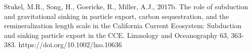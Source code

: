\documentclass[12pt,letter]{article}
\begin{document}
Stukel, M.R., Song, H., Goericke, R., Miller, A.J., 2017b. The role of subduction and gravitational sinking in particle export, carbon sequestration, and the remineralization length scale in the California Current Ecosystem: Subduction and sinking particle export in the CCE. Limnology and Oceanography 63, 363-383. https://doi.org/10.1002/lno.10636\\









\end{document}
